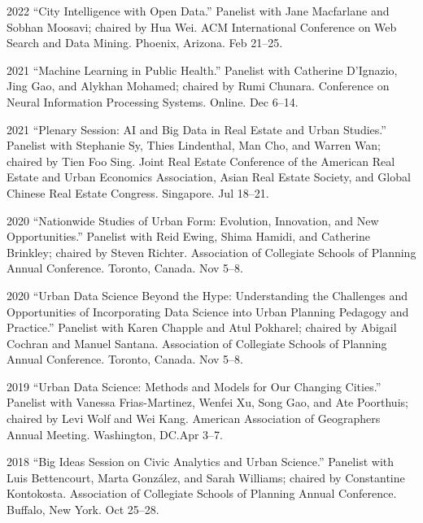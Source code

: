 \documentclass[12pt,letterpaper]{report}
\begin{document}
    \begin{tablist}

        \item[2022] \tab{}\enquote{City Intelligence with Open Data.} Panelist with Jane Macfarlane and Sobhan Moosavi; chaired by Hua Wei. ACM International Conference on Web Search and Data Mining. Phoenix, Arizona. Feb 21--25.

        \item[2021] \tab{}\enquote{Machine Learning in Public Health.} Panelist with Catherine D'Ignazio, Jing Gao, and Alykhan Mohamed; chaired by Rumi Chunara. Conference on Neural Information Processing Systems. Online. Dec 6--14.

        \item[2021] \tab{}\enquote{Plenary Session: AI and Big Data in Real Estate and Urban Studies.} Panelist with Stephanie Sy, Thies Lindenthal, Man Cho, and Warren Wan; chaired by Tien Foo Sing. Joint Real Estate Conference of the American Real Estate and Urban Economics Association, Asian Real Estate Society, and Global Chinese Real Estate Congress. Singapore. Jul 18--21.

        \item[2020] \tab{}\enquote{Nationwide Studies of Urban Form: Evolution, Innovation, and New Opportunities.} Panelist with Reid Ewing, Shima Hamidi, and Catherine Brinkley; chaired by Steven Richter. Association of Collegiate Schools of Planning Annual Conference. Toronto, Canada. Nov 5--8.

        \item[2020] \tab{}\enquote{Urban Data Science Beyond the Hype: Understanding the Challenges and Opportunities of Incorporating Data Science into Urban Planning Pedagogy and Practice.} Panelist with Karen Chapple and Atul Pokharel; chaired by Abigail Cochran and Manuel Santana. Association of Collegiate Schools of Planning Annual Conference. Toronto, Canada. Nov 5--8.

        \item[2019] \tab{}\enquote{Urban Data Science: Methods and Models for Our Changing Cities.} Panelist with Vanessa Frias-Martinez, Wenfei Xu, Song Gao, and Ate Poorthuis; chaired by Levi Wolf and Wei Kang. American Association of Geographers Annual Meeting. Washington, DC.\@ Apr 3--7.

        \item[2018] \tab{}\enquote{Big Ideas Session on Civic Analytics and Urban Science.} Panelist with Luis Bettencourt, Marta Gonz{\'a}lez, and Sarah Williams; chaired by Constantine Kontokosta. Association of Collegiate Schools of Planning Annual Conference. Buffalo, New York. Oct 25--28.


\end{tablist}
\end{document}
